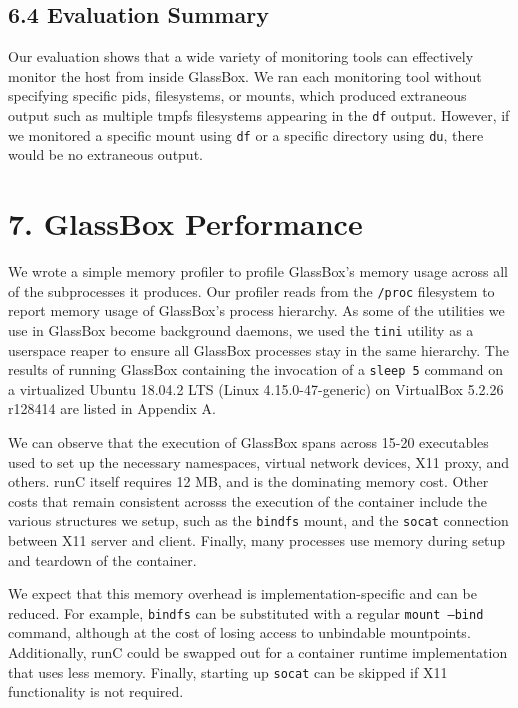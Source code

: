 \documentclass{proc}
\begin{document}
\subsection*{6.4 Evaluation Summary}

Our evaluation shows that a wide variety of monitoring tools can effectively monitor the host from inside GlassBox. We ran each monitoring tool without specifying specific pids, filesystems, or mounts, which produced extraneous output such as multiple tmpfs filesystems appearing in the \texttt{df} output. However, if we monitored a specific mount using  \texttt{df} or a specific directory using \texttt{du}, there would be no extraneous output.

\section*{7. GlassBox Performance}

We wrote a simple memory profiler to profile GlassBox's memory usage across all of the subprocesses it produces. Our profiler reads from the \texttt{/proc} filesystem to report memory usage of GlassBox's process hierarchy. As some of the utilities we use in GlassBox become background daemons, we used the \texttt{tini} utility \cite{tinigithub} as a userspace reaper to ensure all GlassBox processes stay in the same hierarchy. The results of running GlassBox containing the invocation of a \texttt{sleep 5} command on a virtualized Ubuntu 18.04.2 LTS (Linux 4.15.0-47-generic) on VirtualBox 5.2.26 r128414 are listed in Appendix A.

We can observe that the execution of GlassBox spans across 15-20 executables used to set up the necessary namespaces, virtual network devices, X11 proxy, and others. runC itself requires 12 MB, and is the dominating memory cost. Other costs that remain consistent acrosss the execution of the container include the various structures we setup, such as the \texttt{bindfs} mount, and the \texttt{socat} connection between X11 server and client. Finally, many processes use memory during setup and teardown of the container.

We expect that this memory overhead is implementation-specific and can be reduced. For example, \texttt{bindfs} can be substituted with a regular \texttt{mount --bind} command, although at the cost of losing access to unbindable mountpoints. Additionally, runC could be swapped out for a container runtime implementation that uses less memory. Finally, starting up \texttt{socat} can be skipped if X11 functionality is not required.
\end{document}
